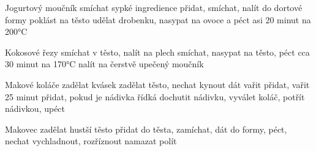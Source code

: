 \documentclass[12pt,a4paper]{article}
\begin{document}
\begin{recipe}{Jogurtový moučník}
   smíchat sypké ingredience
   přidat, smíchat, nalít do dortové formy
   poklást na těsto
   udělat drobenku, nasypat na ovoce a péct asi 20 minut na 200°C
\end{recipe}
\newpage

\begin{recipe}{Kokosové řezy}
   smíchat v těsto, nalít na plech
   smíchat, nasypat na těsto, péct cca 30 minut na 170°C
   nalít na čerstvě upečený moučník
\end{recipe}
\newpage

\begin{recipe}{Makové koláče}
   zadělat kvásek
   zadělat těsto, nechat kynout
   dát vařit
   přidat, vařit 25 minut
   přidat, pokud je nádivka řídká
   dochutit nádivku, vyválet koláč, potřít nádivkou, upéct
\end{recipe}
\newpage

\begin{recipe}{Makovec}
   zadělat hustší těsto
   přidat do těsta, zamíchat, dát do formy, péct, nechat vychladnout, rozříznout
   namazat
   polít
\end{recipe}
\newpage
\end{document}
